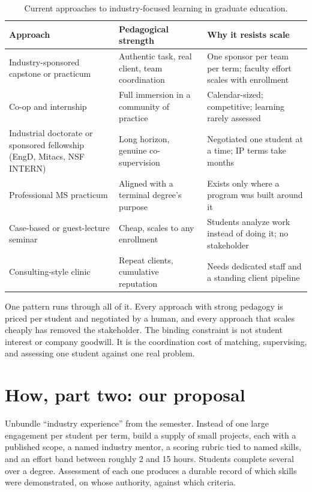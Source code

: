 \documentclass[10pt,letterpaper]{article}
\begin{document}
\begin{table}[ht]
\centering\scriptsize
\caption{Current approaches to industry-focused learning in graduate education.}
\label{tab:approaches}
\begin{tabularx}{\textwidth}{@{}>{\raggedright\arraybackslash}p{} Y Y@{}}
\toprule
\textbf{Approach} & \textbf{Pedagogical strength} & \textbf{Why it resists scale} \\
\midrule
Industry-sponsored capstone or practicum
 & Authentic task, real client, team coordination~\cite{crawley2014}
 & One sponsor per team per term; faculty effort scales with enrollment \\
Co-op and internship
 & Full immersion in a community of practice
 & Calendar-sized; competitive; learning rarely assessed \\
Industrial doctorate or sponsored fellowship (EngD, Mitacs, NSF INTERN)
 & Long horizon, genuine co-supervision
 & Negotiated one student at a time; IP terms take months \\
Professional MS practicum
 & Aligned with a terminal degree's purpose
 & Exists only where a program was built around it \\
Case-based or guest-lecture seminar
 & Cheap, scales to any enrollment
 & Students analyze work instead of doing it; no stakeholder \\
Consulting-style clinic
 & Repeat clients, cumulative reputation
 & Needs dedicated staff and a standing client pipeline \\
\bottomrule
\end{tabularx}
\end{table}

One pattern runs through all of it. Every approach with strong pedagogy is priced per student and
negotiated by a human, and every approach that scales cheaply has removed the stakeholder. The binding
constraint is not student interest or company goodwill. It is the coordination cost of matching,
supervising, and assessing one student against one real problem.

\section{How, part two: our proposal}

Unbundle ``industry experience'' from the semester. Instead of one large engagement per student per
term, build a supply of small projects, each with a published scope, a named industry mentor, a
scoring rubric tied to named skills, and an effort band between roughly 2 and 15 hours. Students
complete several over a degree. Assessment of each one produces a durable record of which skills were
demonstrated, on whose authority, against which criteria.
\end{document}
